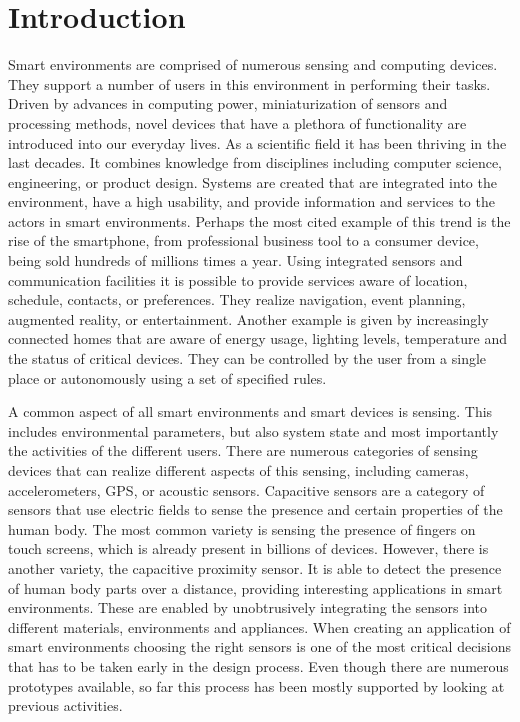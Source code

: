 \chapter{Introduction}
Smart environments are comprised of numerous sensing and computing devices. They support a number of users in this environment in performing their tasks. Driven by advances in computing power, miniaturization of sensors and processing methods, novel devices that have a plethora of functionality are introduced into our everyday lives. As a scientific field it has been thriving in the last decades. It combines knowledge from disciplines including computer science, engineering, or product design. Systems are  created that are integrated into the environment, have a high usability, and provide information and services to the actors in smart environments. Perhaps the most cited example of this trend is the rise of the smartphone, from professional business tool to a consumer device, being sold hundreds of millions times a year. Using integrated sensors and communication facilities it is possible to provide services aware of location, schedule, contacts, or preferences. They realize navigation, event planning, augmented reality, or entertainment. Another example is given by increasingly connected homes that are aware of energy usage, lighting levels, temperature and the status of critical devices. They can be controlled by the user from a single place or autonomously using a set of specified rules. 

A common aspect of all smart environments and smart devices is sensing. This includes environmental parameters, but also system state and most importantly the activities of the different users. There are numerous categories of sensing devices that can realize different aspects of this sensing, including cameras, accelerometers, GPS, or acoustic sensors. Capacitive sensors are a category of sensors that use electric fields to sense the presence and certain properties of the human body. The most common variety is sensing the presence of fingers on touch screens, which is already present in billions of devices. However, there is another variety, the capacitive proximity sensor. It is able to detect the presence of human body parts over a distance, providing interesting applications in smart environments. These are enabled by unobtrusively integrating the sensors into different materials, environments and appliances. When creating an application of smart environments choosing the right sensors is one of the most critical decisions that has to be taken early in the design process. Even though there are numerous prototypes available, so far this process has been mostly supported by looking at previous activities. 

